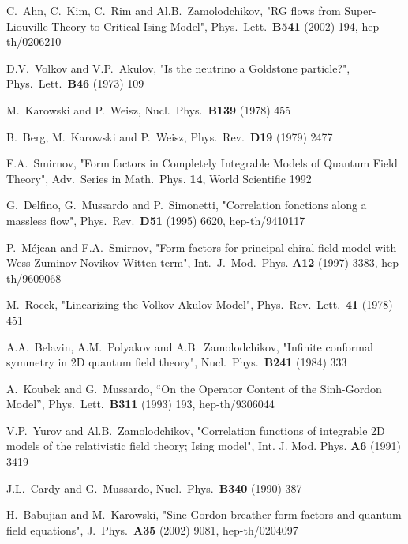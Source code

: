 \documentclass[11pt,a4paper]{article}
\begin{document}
\begin{thebibliography}{99}
 C.~Ahn, C.~Kim, C.~Rim and Al.B.~Zamolodchikov, "RG
flows from Super-Liouville Theory to Critical Ising Model",
Phys.~Lett.~\textbf{B541} (2002) 194, hep-th/0206210





 D.V.~Volkov and V.P.~Akulov, "Is the neutrino a
Goldstone particle?", Phys.~Lett.~\textbf{B46} (1973) 109




 M.~Karowski and P.~Weisz, Nucl.~Phys.~\textbf{B139}
(1978) 455

 B.~Berg, M.~Karowski and P.~Weisz,
Phys.~Rev.~\textbf{D19} (1979) 2477

 F.A.~Smirnov, "Form factors in Completely Integrable
Models of Quantum Field Theory", Adv.~Series in Math.~Phys.
\textbf{14}, World Scientific 1992


 G.~Delfino, G.~Mussardo and P.~Simonetti,
"Correlation fonctions along a massless flow",
Phys.~Rev.~\textbf{D51} (1995) 6620, hep-th/9410117



 P.~M\'ejean and F.A.~Smirnov, "Form-factors for principal chiral field model
with Wess-Zuminov-Novikov-Witten term", Int.~J.~Mod.~Phys.
\textbf{A12} (1997) 3383, hep-th/9609068



 M.~Rocek, "Linearizing the Volkov-Akulov Model", Phys.~Rev.~Lett.~\textbf{41} (1978) 451

 A.A.~Belavin, A.M.~Polyakov and A.B.~Zamolodchikov, "Infinite conformal symmetry in 2D
 quantum field theory", Nucl.~Phys.~\textbf{B241} (1984) 333


 A.~Koubek and G.~Mussardo, ``On the Operator Content of the Sinh-Gordon Model'', Phys.~Lett.~\textbf{B311} (1993) 193, hep-th/9306044


 V.P.~Yurov and Al.B.~Zamolodchikov, "Correlation functions of integrable 2D models of the
 relativistic field theory; Ising model", Int. J. Mod. Phys.
 \textbf{A6} (1991) 3419






 J.L.~Cardy and G.~Mussardo, Nucl.~Phys.~\textbf{B340} (1990) 387


 H.~Babujian and M.~Karowski, "Sine-Gordon breather
form factors and quantum field equations", J.~Phys.~\textbf{A35} (2002) 9081, hep-th/0204097


\end{thebibliography}
\end{document}

